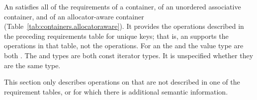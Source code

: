 \pnum
An  satisfies all of the requirements of a container, of an unordered associative container, and of an allocator-aware container (Table~\ref{tab:containers.allocatoraware}). It provides the operations described in the preceding requirements table for unique keys; that is, an  supports the  operations in that table, not the  operations. For an  the  and the value type are both . The  and  types are both const iterator types. It is unspecified whether they are the same type.

\pnum
This section only describes operations on  that
are not described in one of the requirement tables, or for which there
is additional semantic information.

